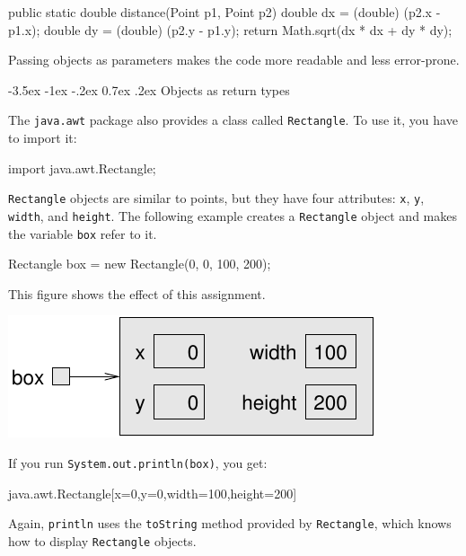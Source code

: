 \documentclass[12pt]{book}
\makeatletter
\theoremstyle{exercise}
\newcommand{\java}[1]{\verb"#1"}
\renewcommand{\section}{\@startsection{section}{1}{\z@}%
    {-3.5ex \@plus -1ex \@minus -.2ex}%
    {0.7ex \@plus.2ex}%
    {\normalfont\Large\bfseries}}
\newcommand{\java}[1]{\lstinline{#1}} %
\makeatother
\begin{document}
\begin{code}
    public static double distance(Point p1, Point p2) {
        double dx = (double) (p2.x - p1.x);
        double dy = (double) (p2.y - p1.y);
        return Math.sqrt(dx * dx + dy * dy);
    }
\end{code}

Passing objects as parameters makes the code more readable and less error-prone.


\section{Objects as return types}


The \java{java.awt} package also provides a class called \java{Rectangle}.
To use it, you have to import it:

\begin{code}
import java.awt.Rectangle;
\end{code}

\java{Rectangle} objects are similar to points, but they have four attributes: \java{x}, \java{y}, \java{width}, and \java{height}.
The following example creates a \java{Rectangle} object and makes the variable \java{box} refer to it.

\begin{code}
    Rectangle box = new Rectangle(0, 0, 100, 200);
\end{code}

This figure shows the effect of this assignment.

\begin{center}
\includegraphics{figs/rectangle.pdf}
\end{center}

If you run \java{System.out.println(box)}, you get:

\begin{stdout}
java.awt.Rectangle[x=0,y=0,width=100,height=200]
\end{stdout}

Again, \java{println} uses the \java{toString} method provided by \java{Rectangle}, which knows how to display \java{Rectangle} objects.
\end{document}
